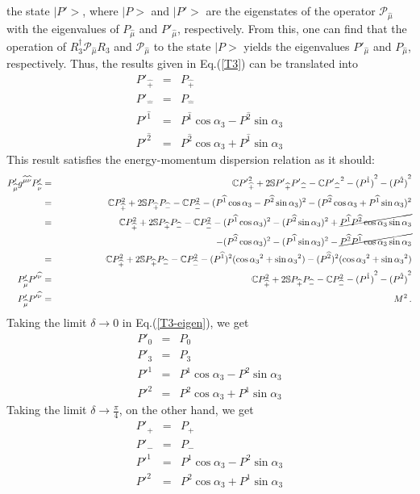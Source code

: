 \documentclass[]{article}
\numberwithin{equation}{section}
\def\bea{\begin{eqnarray}}
\def\eea{\end{eqnarray}}
\def\wh{\widehat}
\begin{document}
{the state $|P'>$, where $|P>$ and $|P'>$ are the eigenstates of the operator 
${\mathcal P}_{\wh{\mu}}$ with the eigenvalues of  $P_{\wh{\mu}}$ 
and $P'_{\wh{\mu}}$, respectively. From this, one can find that the operation of 
$R_3^{\dagger} {\mathcal P}_{\wh{\mu}}R_3$ and ${\mathcal P}_{\wh{\mu}}$ to the state $|P>$ yields the eigenvalues 
$P'_{\wh{\mu}}$ and $P_{\wh{\mu}}$, respectively.
Thus, the results given in Eq.(\ref{T3}) can be translated into
\bea
\label{T3-eigen}
P'_{\wh+} & = & P_{\wh+}
\nonumber\\ 
P'_{\wh-} & = & P_{\wh-}
\nonumber\\
P'^{\wh{1}} & = & {P}^{\wh{1}}\cos{\alpha_3}-{P}^{\wh{2}} \sin{\alpha_3} \nonumber\\
P'^{\wh{2}} & = & {P}^{\wh{2}}\cos{\alpha_3}+{P}^{\wh{1}} \sin{\alpha_3}
\eea
%
This result satisfies the energy-momentum dispersion relation as it should:
\bea
P'_{\wh \mu}g^{{\wh\mu}{\wh\nu}}P'_{\wh\nu} & = & \mathbb{C}{P'}_{\wh+}^2 + 2\mathbb{S}{P'}_{\wh+} {P'}_{\wh-}-\mathbb{C}{{P'}_{\wh-}}^2-{(P^{\hat1})}^2-{(P^{\hat2})}^2 \nonumber \\
    & = & \mathbb{C}P_{\wh+}^2 + 2\mathbb{S}P_{\wh+}P_{\wh-}-\mathbb{C}P_{\wh-}^2-({P}^{\wh{1}}\cos{\alpha_3}-{P}^{\wh{2}} \sin{\alpha_3})^2 - ({P}^{\wh{2}}\cos{\alpha_3}+{P}^{\wh{1}} \sin{\alpha_3})^2
    \nonumber \\
    & = & \mathbb{C}P_{\wh+}^2 + 2\mathbb{S}P_{\wh+}P_{\wh-}-\mathbb{C}P_{\wh-}^2-({P}^{\wh{1}}\cos{\alpha_3})^2-({P}^{\wh{2}} \sin{\alpha_3})^2 +\cancel{ {P}^{\wh{1}}{P}^{\wh{2}}\cos{\alpha_3}\sin{\alpha_3}}\nonumber \\
    &  &~~~~~~~~~~~~~~~~~~~~~~~~~~~~~~~~~~~~~~~~~~~~~~~~~~~-({P}^{\wh{2}}\cos{\alpha_3})^2-({P}^{\wh{1}} \sin{\alpha_3})^2-\cancel{{P}^{\wh{2}}{P}^{\wh{1}}\cos{\alpha_3} \sin{\alpha_3}}
    \nonumber \\
    & = & \mathbb{C}P_{\wh+}^2 + 2\mathbb{S}P_{\wh+}P_{\wh-}-\mathbb{C}P_{\wh-}^2-({P}^{\wh{1}})^2(\cos{\alpha_3}^2+\sin{\alpha_3}^2)-({P}^{\wh{2}})^2(\cos{\alpha_3}^2+\sin{\alpha_3}^2)
    \nonumber \\
    P'_{\wh \mu}P'^{\wh\nu}& = & \mathbb{C}P_{\wh+}^2 + 2\mathbb{S}P_{\wh+}P_{\wh-}-\mathbb{C}P_{\wh-}^2-{(P^{\hat1})}^2-{(P^{\hat2})}^2
    \nonumber \\
    P'_{\wh \mu}P'^{\wh\nu}&= & M^2 \, .
\eea
%
Taking the limit $\delta \rightarrow 0$ in Eq.(\ref{T3-eigen}), we get
\bea
\label{T3IFD}
P'_{0} & = & P_{0}
\nonumber\\ 
P'_{3} & = & P_{3}
\nonumber\\
P'^{1} & = & {P}^{1}\cos{\alpha_3}-{P}^{2} \sin{\alpha_3} \nonumber\\
P'^{2} & = & {P}^{2}\cos{\alpha_3}+{P}^{1} \sin{\alpha_3} \nonumber
\eea
%
Taking the limit $\delta \rightarrow \frac{\pi}{4}$, on the other hand, we get
\bea
\label{T3LFD}
P'_{+} & = & P_{+}
\nonumber\\ 
P'_{-} & = & P_{-}
\nonumber\\
P'^{{1}} & = & {P}^{{1}}\cos{\alpha_3}-{P}^{{2}} \sin{\alpha_3} \nonumber\\
P'^{{2}} & = & {P}^{{2}}\cos{\alpha_3}+{P}^{{1}} \sin{\alpha_3} \nonumber
\eea
 
}
\end{document}
